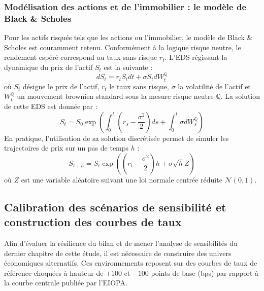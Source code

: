 \subsubsection{Modélisation des actions et de l'immobilier : le modèle de Black \& Scholes}
Pour les actifs risqués tels que les actions ou l'immobilier, le modèle de Black \& Scholes est couramment retenu. Conformément à la logique risque neutre, le rendement espéré correspond au taux sans risque $r_t$. L'EDS régissant la dynamique du prix de l'actif $S_t$ est la suivante :
\begin{equation}
    dS_t = r_t S_t dt + \sigma S_t dW^{\mathbb{Q}}_t
    \label{eq:black_scholes_q}
\end{equation}
où $S_t$ désigne le prix de l'actif, $r_t$ le taux sans risque, $\sigma$ la volatilité de l'actif et $W^{\mathbb{Q}}_t$ un mouvement brownien standard sous la mesure risque neutre $\mathbb{Q}$. La solution de cette EDS est donnée par :
\begin{equation}
    S_t = S_0 \exp\left( \int_0^t \left(r_s - \frac{\sigma^2}{2}\right)ds + \int_0^t \sigma dW^{\mathbb{Q}}_s \right)
\end{equation}
En pratique, l'utilisation de sa solution discrétisée permet de simuler les trajectoires de prix sur un pas de temps $h$ :
\begin{equation}
    S_{t+h} = S_t \exp\left( \left(r_t - \frac{\sigma^2}{2}\right)h + \sigma\sqrt{h}Z \right)
    \label{eq:black_scholes_q_discrete}
\end{equation}
où $Z$ est une variable aléatoire suivant une loi normale centrée réduite $\mathcal{N}(0,1)$.

\subsection{Calibration des scénarios de sensibilité et construction des courbes de taux}
\label{subsec:calibration_chocs_taux}

Afin d'évaluer la résilience du bilan et de mener l'analyse de sensibilités du dernier chapitre de cette étude, il est nécessaire de construire des univers économiques alternatifs. Ces environnements reposent sur des courbes de taux de référence choquées à hauteur de $+100$ et $-100$ points de base (bps) par rapport à la courbe centrale publiée par l'EIOPA.

